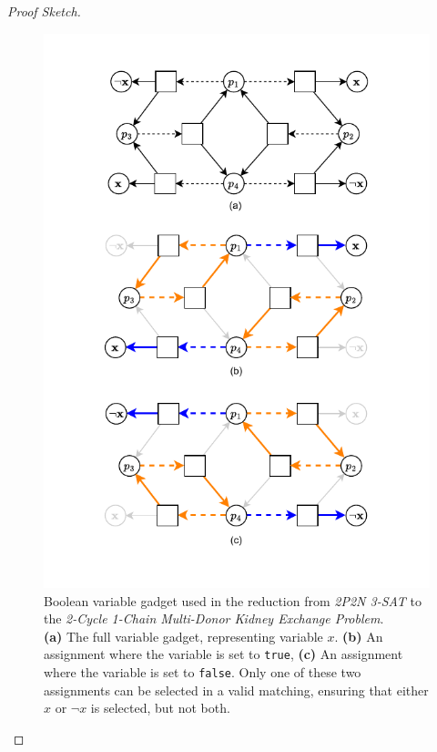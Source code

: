 \begin{proof}[Proof Sketch]
\begin{figure}
    \centering
    \includegraphics{data/sat_reduction_boolean_gadget.pdf}
    \caption[Boolean variable gadget used in the reduction from \textit{2P2N 3-SAT} to the \textit{2-Cycle 1-Chain Multi-Donor Kidney Exchange Problem}]{Boolean variable gadget used in the reduction from \textit{2P2N 3-SAT} to the \textit{2-Cycle 1-Chain Multi-Donor Kidney Exchange Problem}.\\
    \textbf{(a)} The full variable gadget, representing variable \(x\). \textbf{(b)} An assignment where the variable is set to \texttt{true}, \textbf{(c)} An assignment where the variable is set to \texttt{false}. Only one of these two assignments can be selected in a valid matching, ensuring that either \(x\) or \(\neg{x}\) is selected, but not both.}
\end{figure}


\end{proof}
